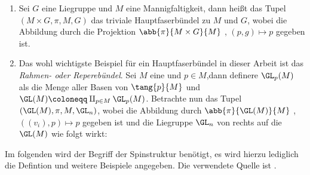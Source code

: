 \begin{Bsp}
	\begin{enumerate}[1)]
		\item Sei $G$ eine Liegruppe und $M$ eine Mannigfaltigkeit, dann heißt das Tupel $(M \times G, \pi, M, G)$ das triviale Hauptfaserbündel zu $M$ und $G$, wobei die Abbildung
		durch die Projektion $\abb{\pi}{M \times G}{M}$ , $(p,g) \mapsto p$ 
		gegeben ist.
		\item Das wohl wichtigste Beispiel für ein Hauptfaserbündel in dieser
		Arbeit ist das \textit{Rahmen- oder Reperebündel}. Sei $M$ eine \mfg und $p \in M$,dann definere $\GL_p(M)$ als die Menge aller Basen von
		$\tang{p}{M}$ und $\GL(M) \coloneqq \amalg_{p \in M} \GL_p(M)$. 
		Betrachte nun das Tupel $(\GL(M),\pi,M,\GL_n)$, wobei die Abbildung
		durch $\abb{\pi}{\GL(M)}{M}$ , $((v_i),p) \mapsto p$ gegeben ist
		und die Liegruppe $\GL_n$ von rechts auf die \mfg $\GL(M)$ wie  folgt
		wirkt:
		\begin{center}
		\end{center}
		
		
	\end{enumerate}
\end{Bsp}


Im folgenden wird der Begriff der Spinstruktur benötigt, es wird
hierzu lediglich die Defintion und weitere Beispiele angegeben.
Die verwendete Quelle ist \cite{BHMMM15}.

